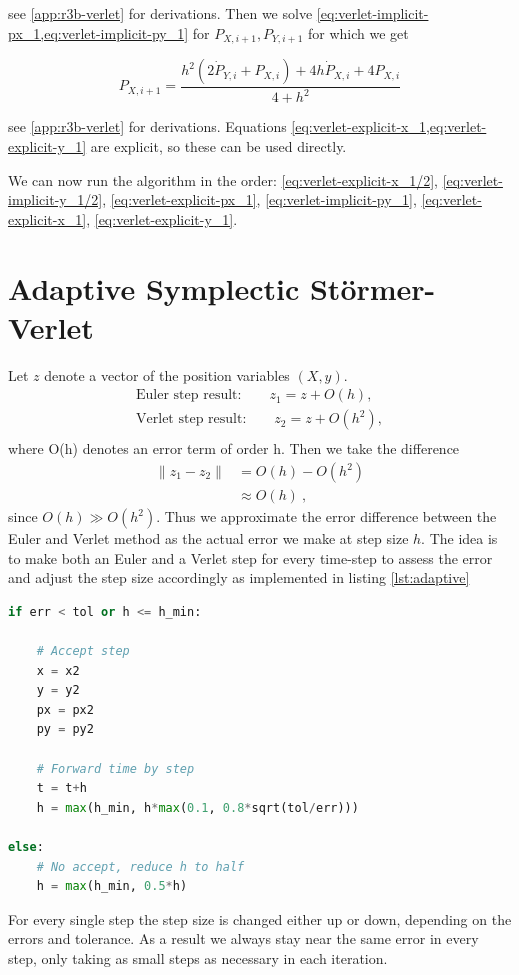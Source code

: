 see \cref{app:r3b-verlet} for derivations. Then we solve \cref{eq:verlet-implicit-px_1,eq:verlet-implicit-py_1} for \(P_{X,i+1},P_{Y,i+1}\) for which we get

\begin{equation}
    P_{X,i+1} = \frac{h^2 (2 \dot{P}_{Y,i} + P_{X,i}) + 4 h \dot{P}_{X,i} + 4 P_{X,i} }{4 + h^2} \label{eq:verlet-explicit-px_1}
\end{equation}

see \cref{app:r3b-verlet} for derivations. Equations \cref{eq:verlet-explicit-x_1,eq:verlet-explicit-y_1} are explicit, so these can be used directly.

We can now run the algorithm in the order: \cref{eq:verlet-explicit-x_1/2}, \cref{eq:verlet-implicit-y_1/2}, \cref{eq:verlet-explicit-px_1}, \cref{eq:verlet-implicit-py_1}, \cref{eq:verlet-explicit-x_1}, \cref{eq:verlet-explicit-y_1}.


\section{Adaptive Symplectic Störmer-Verlet}
Let $z$ denote a vector of the position variables $(X,y)$.
\begin{align}
\text{Euler step result:} \qquad z_1 = z + O(h), \\
\text{Verlet step result:} \qquad z_2 = z + O(h^2), \\
\end{align}
where O(h) denotes an error term of order h. Then we take the difference
\begin{align}
\|z_1 - z_2\| &= O(h) - O(h^2) \\
&\approx O(h)\ ,
\end{align}
since $O(h) \gg O(h^2)$. Thus we approximate the error difference between the Euler and Verlet method as the actual error we make at step size $h$. The idea is to make both an Euler and a Verlet step for every time-step to assess the error and adjust the step size accordingly as implemented in listing \ref{lst:adaptive}
\begin{adjustwidth*}{0cm}{-0.4cm}
\begin{lstlisting}[language=Python,caption=Adaptive method implemented in python. We accept the Verlet step only if the error is no more than a given tolerance \texttt{tol}. Subsequently we estimate a new \texttt{h} that will yield an error of \texttt{tol} in the next step and use \texttt{0.8} of this value to avoid frequent rejects. If the step is rejected we reduce the step size by half,label=lst:adaptive]
if err < tol or h <= h_min:

    # Accept step
    x = x2
    y = y2
    px = px2
    py = py2

    # Forward time by step
    t = t+h
    h = max(h_min, h*max(0.1, 0.8*sqrt(tol/err)))

else:
    # No accept, reduce h to half
    h = max(h_min, 0.5*h)
\end{lstlisting}
\end{adjustwidth*}
For every single step the step size is changed either up or down, depending on the errors and tolerance. As a result we always stay near the same error in every step, only taking as small steps as necessary in each iteration.

